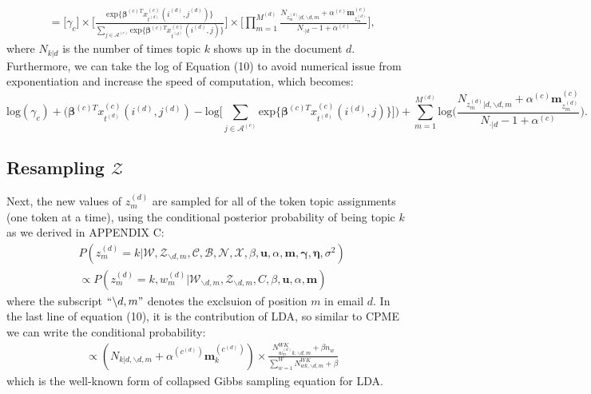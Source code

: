 \documentclass[a4paper]{article}
\begin{document}
 \begin{equation}
 \begin{aligned} &=\Big[ \gamma_{c}\Big]\times\Big[ \frac{\mbox{exp}\{\boldsymbol{\beta}^{(c)T}x^{(c)}_{t^{(d)}}(i^{(d)}, j^{(d)})\}}{\sum_{j\in \mathcal{A}^{(c)}} \mbox{exp}\{\boldsymbol{\beta}^{(c)T}x^{(c)}_{t^{(d)}}(i^{(d)}, j)\}}\Big]\times\Big[\prod_{m=1}^{M^{(d)}}
 \frac{N_{z_m^{(d)}|d, \backslash d, m}+\alpha^{(c)} \boldsymbol{m}^{(c)}_{z_m^{(d)}}}{N_{\cdot|d}-1+\alpha^{(c)}}\Big],
 \end{aligned}
 \end{equation}
 where $N_{k|d}$ is the number of times topic $k$ shows up in the document $d$. Furthermore, we can take the log of Equation (10) to avoid numerical issue from exponentiation and increase the speed of computation, which becomes:
 \begin{equation}
 \mbox{log}(\gamma_{c})+\Big(\boldsymbol{\beta}^{(c)T}x^{(c)}_{t^{(d)}}(i^{(d)}, j^{(d)})-\mbox{log}\big[\sum_{j\in \mathcal{A}^{(c)}}\mbox{exp}\{\boldsymbol{\beta}^{(c)T}x^{(c)}_{t^{(d)}}(i^{(d)}, j)\}\big]\Big)+\sum_{m=1}^{M^{(d)}}\mbox{log}\Big(\frac{N_{z_m^{(d)}|d, \backslash d, m}+\alpha^{(c)} \boldsymbol{m}^{(c)}_{z_m^{(d)}}}{N_{\cdot|d}-1+\alpha^{(c)}}\Big).
 \end{equation}
 \subsection{Resampling $\mathcal{Z}$}
 Next, the new values of $z^{(d)}_m$ are sampled for all of the token topic assignments (one token at a time), using the conditional posterior probability of being topic $k$ as we derived in APPENDIX C:
 \begin{equation}
 \begin{aligned} & 
 P(z^{(d)}_m=k|\mathcal{W}, \mathcal{Z}_{\backslash d, m},  \mathcal{C}, \mathcal{B}, \mathcal{N}, \mathcal{X}, \beta, \boldsymbol{u}, \alpha, \boldsymbol{m}, \boldsymbol{\gamma}, \boldsymbol{\eta}, \sigma^2)\\
 & \propto P(z^{(d)}_m=k, w^{(d)}_m|\mathcal{W}_{\backslash d, m}, \mathcal{Z}_{\backslash d,m}, C, \beta, \boldsymbol{u}, \alpha, \boldsymbol{m})
 \end{aligned}
 \end{equation}
 where the subscript $``{\backslash d, m}"$ denotes the exclsuion of position $m$ in email $d$. In the last line of equation (10), it is the contribution of LDA, so similar to CPME we can write the conditional probability:
 \begin{equation}
 \begin{aligned} 
 & \propto(N_{k|d, \backslash d, m}+\alpha^{(c^{(d)})} \boldsymbol{m}^{(c^{(d)})}_k)\times\frac{N_{w_m^{(d)}k, \backslash d, m}^{WK}+\beta n_w}{\sum_{w=1}^WN_{wk,  \backslash d, m}^{WK}+\beta}
 \end{aligned}
 \end{equation}
 which is the well-known form of collapsed Gibbs sampling equation for LDA.
\end{document}
